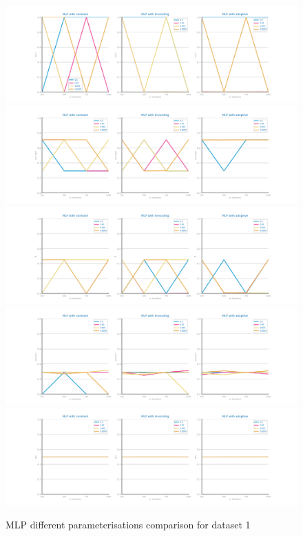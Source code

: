 \documentclass[10pt]{extarticle}
\begin{document}
\begin{figure}[H]
\centering\includegraphics[scale=0.60]{images/dataset1/models_evaluation/CovidPos_mlp_recall_study.png}
\includegraphics[scale=0.60]{images/dataset1/models_evaluation/CovidPos_mlp_accuracy_study.png}
\includegraphics[scale=0.60]{images/dataset1/models_evaluation/CovidPos_mlp_f1_study.png}
\includegraphics[scale=0.60]{images/dataset1/models_evaluation/CovidPos_mlp_precision_study.png}
\includegraphics[scale=0.60]{images/dataset1/models_evaluation/CovidPos_mlp_auc_study.png}
\caption{MLP different parameterisations comparison for dataset 1}
\end{figure}
\end{document}
